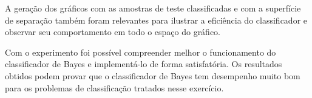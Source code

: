 \documentclass[12pt]{article}
\begin{document}
  \par A geração dos gráficos com as amostras de teste classificadas e com a superfície de separação também foram relevantes para ilustrar a eficiência do classificador e observar seu comportamento em todo o espaço do gráfico. 
  
  \par Com o experimento foi possível compreender melhor o funcionamento do classificador de Bayes e implementá-lo de forma satisfatória. Os resultados obtidos podem provar que o classificador de Bayes tem desempenho muito bom para os problemas de classificação tratados nesse exercício. 
\end{document}
